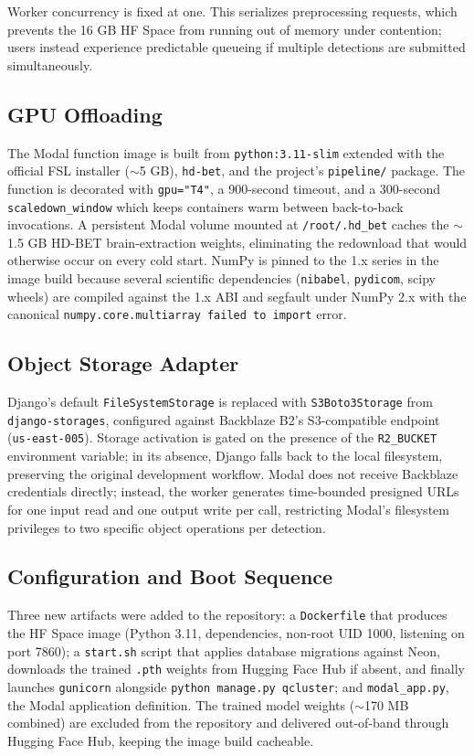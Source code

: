 \documentclass[11pt, a4paper]{article}
\begin{document}
Worker concurrency is fixed at one. This serializes preprocessing requests, which prevents the 16 GB HF Space from running out of memory under contention; users instead experience predictable queueing if multiple detections are submitted simultaneously.

\subsection{GPU Offloading}

The Modal function image is built from \texttt{python:3.11-slim} extended with the official FSL installer ($\sim$5 GB), \texttt{hd-bet}, and the project's \texttt{pipeline/} package. The function is decorated with \texttt{gpu="T4"}, a 900-second timeout, and a 300-second \texttt{scaledown\_window} which keeps containers warm between back-to-back invocations. A persistent Modal volume mounted at \texttt{/root/.hd\_bet} caches the $\sim$1.5 GB HD-BET brain-extraction weights, eliminating the redownload that would otherwise occur on every cold start. NumPy is pinned to the 1.x series in the image build because several scientific dependencies (\texttt{nibabel}, \texttt{pydicom}, scipy wheels) are compiled against the 1.x ABI and segfault under NumPy 2.x with the canonical \texttt{numpy.core.multiarray failed to import} error.

\subsection{Object Storage Adapter}

Django's default \texttt{FileSystemStorage} is replaced with \texttt{S3Boto3Storage} from \texttt{django-storages}, configured against Backblaze B2's S3-compatible endpoint (\texttt{us-east-005}). Storage activation is gated on the presence of the \texttt{R2\_BUCKET} environment variable; in its absence, Django falls back to the local filesystem, preserving the original development workflow. Modal does not receive Backblaze credentials directly; instead, the worker generates time-bounded presigned URLs for one input read and one output write per call, restricting Modal's filesystem privileges to two specific object operations per detection.

\subsection{Configuration and Boot Sequence}

Three new artifacts were added to the repository: a \texttt{Dockerfile} that produces the HF Space image (Python 3.11, dependencies, non-root UID 1000, listening on port 7860); a \texttt{start.sh} script that applies database migrations against Neon, downloads the trained \texttt{.pth} weights from Hugging Face Hub if absent, and finally launches \texttt{gunicorn} alongside \texttt{python manage.py qcluster}; and \texttt{modal\_app.py}, the Modal application definition. The trained model weights ($\sim$170 MB combined) are excluded from the repository and delivered out-of-band through Hugging Face Hub, keeping the image build cacheable.
\end{document}
